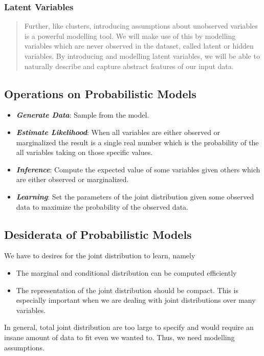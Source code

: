 \documentclass[11pt]{article}
\begin{document}
\subsubsection{Latent Variables} 
\begin{quote}
    Further, like clusters, introducing assumptions about unobserved variables is a powerful modelling tool. We will make use of this by modelling variables which are never observed in the dataset, called latent or hidden variables. By introducing and modelling latent variables, we will be able to naturally describe and capture abstract features of our input data.
\end{quote}

\subsection{Operations on Probabilistic Models}
\begin{itemize}
    \item \textit{\textbf{Generate Data}}: Sample from the model.
    \item \textit{\textbf{Estimate Likelihood}}: When all variables are either observed or marginalized the result is a single real number which is the probability of the all variables taking on those specific values.
    \item \textit{\textbf{Inference}}: Compute the expected value of some variables given others which are either observed or marginalized. 
    \item \textit{\textbf{Learning}}: Set the parameters of the joint distribution given some observed data to maximize the probability of the observed data. 
\end{itemize}

\subsection{Desiderata of Probabilistic Models}
We have to desires for the joint distribution to learn, namely
\begin{itemize}
    \item The marginal and conditional distribution can be computed efficiently
    \item The representation of the joint distribution should be compact. This is especially important when we are dealing with joint distributions over many variables.
\end{itemize}
In general, total joint distribution are too large to specify and would require an insane amount of data to fit even we wanted to. Thus, we need modelling assumptions. 
\end{document}
